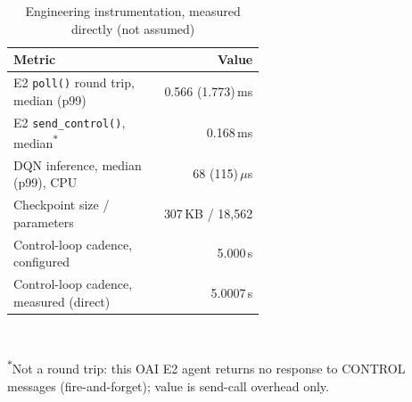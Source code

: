 \begin{table}[t]
\centering
\caption{Engineering instrumentation, measured directly (not assumed)}
\label{tab:engineering}
\small
\begin{tabular}{@{}p{0.56\linewidth}r@{}}
\toprule
Metric & Value \\
\midrule
E2 \texttt{poll()} round trip, median (p99) & 0.566 (1.773)\,ms \\
E2 \texttt{send\_control()}, median\textsuperscript{$\ast$} & 0.168\,ms \\
DQN inference, median (p99), CPU & 68 (115)\,$\mu$s \\
Checkpoint size / parameters & 307\,KB / 18,562 \\
Control-loop cadence, configured & 5.000\,s \\
Control-loop cadence, measured (direct) & 5.0007\,s \\
\bottomrule
\end{tabular}
\\[2pt]
\raggedright\footnotesize\textsuperscript{$\ast$}Not a round trip: this OAI E2 agent returns no response to CONTROL messages (fire-and-forget); value is send-call overhead only.
\end{table}
